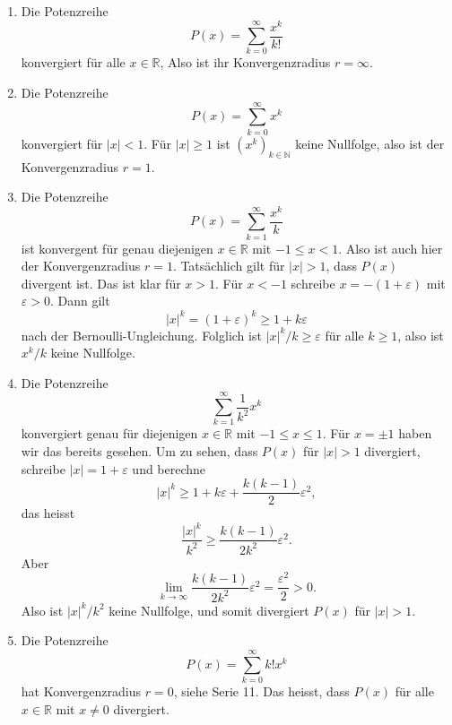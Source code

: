 \documentclass[../main.tex]{subfiles}
\begin{document}
\begin{examples}
  \leavevmode
  \begin{enumerate}[(1)]
    \item Die Potenzreihe
      \[
        P(x) = \sum_{k=0}^{\infty} \frac{x^k}{k!}
      \]
      konvergiert für alle $x \in \mathbb{R}$, 
      Also ist ihr Konvergenzradius $r = \infty$.
    \item Die Potenzreihe
      \[
        P(x) = \sum_{k=0}^{\infty} x^k
      \]
      konvergiert für $|x| < 1$. Für $|x| \geq 1$ ist ${(x^{k})}_{k \in \mathbb{N}}$ keine
      Nullfolge, also ist der Konvergenzradius $r = 1$.
    \item Die Potenzreihe
      \[
        P(x) = \sum_{k=1}^{\infty} \frac{x^k}{k}
      \]
      ist konvergent für genau diejenigen $x \in \mathbb{R}$ mit $-1 \leq x < 1$.
      Also ist auch hier der Konvergenzradius $r = 1$.
      Tatsächlich gilt für $|x| > 1$, dass $P(x)$ divergent ist.
      Das ist klar für $x > 1$. Für $x < -1$ schreibe
      $x = -(1 + \varepsilon)$ mit $\varepsilon > 0$.
      Dann gilt 
      \[
        |x|^k = (1 + \varepsilon)^k \geq 1 + k \varepsilon
      \]
      nach der Bernoulli-Ungleichung. Folglich ist $|x|^k/k \geq \varepsilon$ 
      für alle $k \geq 1$, also ist $x^k/k$ keine Nullfolge.
    \item Die Potenzreihe
      \[
        \sum_{k=1}^{\infty} \frac{1}{k^2}x^k
      \]
      konvergiert genau für diejenigen $x \in \mathbb{R}$ mit $-1 \leq x \leq 1$.
      Für $x = \pm 1$ haben wir das bereits gesehen. Um zu sehen, dass
      $P(x)$ für $|x| > 1$ divergiert, schreibe
      \(
        |x| = 1 + \varepsilon
      \)
      und berechne
      \[
        |x|^k \geq 1 + k \varepsilon + \frac{k(k-1)}{2}\varepsilon^2,
      \]
      das heisst
      \[
        \frac{|x|^k}{k^2} \geq \frac{k(k-1)}{2k^2} \varepsilon^2.
      \]
      Aber
      \[
        \lim_{k \to \infty} \frac{k(k-1)}{2k^2}\varepsilon^2 = \frac{\varepsilon^2}{2} > 0.
      \]
      Also ist $|x|^k/k^2$ keine Nullfolge, und somit divergiert $P(x)$ für $|x| > 1$.
    \item Die Potenzreihe
      \[
        P(x) = \sum_{k=0}^{\infty} k! x^k
      \]
      hat Konvergenzradius $r = 0$, siehe Serie 11.
      Das heisst, dass $P(x)$ für alle $x \in \mathbb{R}$ mit $x \neq 0$ divergiert.
  \end{enumerate}
\end{examples}
\end{document}
